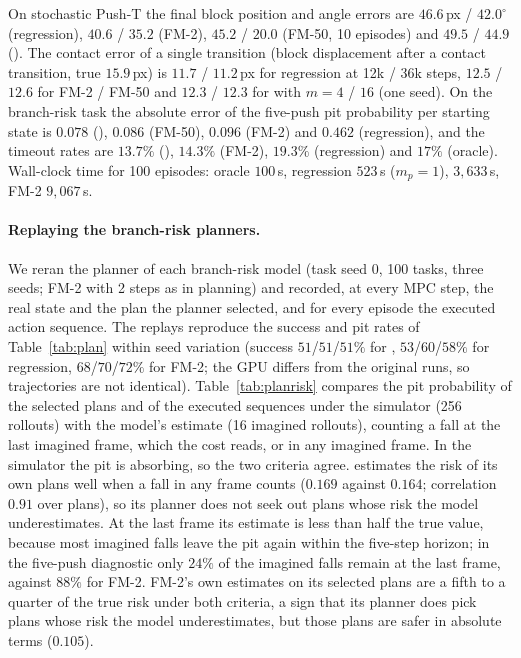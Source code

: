 On stochastic Push-T the final block position and angle errors are $46.6$\,px / $42.0^\circ$ (regression), $40.6$ / $35.2$ (FM-2), $45.2$ / $20.0$ (FM-50, 10 episodes) and $49.5$ / $44.9$ (\imlewm{}). The contact error of a single transition (block displacement after a contact transition, true $15.9$\,px) is $11.7$ / $11.2$\,px for regression at 12k / 36k steps, $12.5$ / $12.6$ for FM-2 / FM-50 and $12.3$ / $12.3$ for \imlewm{} with $m = 4$ / $16$ (one seed). On the branch-risk task the absolute error of the five-push pit probability per starting state is $0.078$ (\imlewm{}), $0.086$ (FM-50), $0.096$ (FM-2) and $0.462$ (regression), and the timeout rates are $13.7\%$ (\imlewm{}), $14.3\%$ (FM-2), $19.3\%$ (regression) and $17\%$ (oracle). Wall-clock time for 100 episodes: oracle $100$\,s, regression $523$\,s ($m_p{=}1$), \imlewm{} $3{,}633$\,s, FM-2 $9{,}067$\,s.

\paragraph{Replaying the branch-risk planners.} We reran the planner of each branch-risk model (task seed 0, 100 tasks, three seeds; FM-2 with 2 steps as in planning) and recorded, at every MPC step, the real state and the plan the planner selected, and for every episode the executed action sequence. The replays reproduce the success and pit rates of Table~\ref{tab:plan} within seed variation (success $51$/$51$/$51\%$ for \imlewm{}, $53$/$60$/$58\%$ for regression, $68$/$70$/$72\%$ for FM-2; the GPU differs from the original runs, so trajectories are not identical). Table~\ref{tab:planrisk} compares the pit probability of the selected plans and of the executed sequences under the simulator (256 rollouts) with the model's estimate (16 imagined rollouts), counting a fall at the last imagined frame, which the cost reads, or in any imagined frame. In the simulator the pit is absorbing, so the two criteria agree. \imlewm{} estimates the risk of its own plans well when a fall in any frame counts ($0.169$ against $0.164$; correlation $0.91$ over plans), so its planner does not seek out plans whose risk the model underestimates. At the last frame its estimate is less than half the true value, because most imagined falls leave the pit again within the five-step horizon; in the five-push diagnostic only $24\%$ of the imagined falls remain at the last frame, against $88\%$ for FM-2. FM-2's own estimates on its selected plans are a fifth to a quarter of the true risk under both criteria, a sign that its planner does pick plans whose risk the model underestimates, but those plans are safer in absolute terms ($0.105$).

